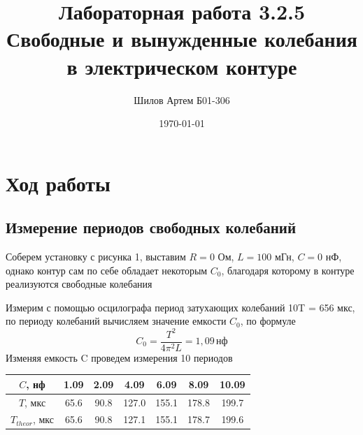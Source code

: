 \documentclass[a4paper,12pt]{article}
\author{Шилов Артем Б01-306}
\title{Лабораторная работа 3.2.5 \\
	\textbf{Свободные и вынужденные колебания в электрическом контуре}}
\date{\today}
\theoremstyle{definition}
\begin{document}
	
{\Large \maketitle}


\section{Ход работы}
\subsection{Измерение периодов свободных колебаний}
Соберем установку с рисунка 1, выставим $R=0$ Ом, $L=100$ мГн, $C=0$ нФ,  однако контур сам по себе обладает некоторым $C_0$, благодаря которому в контуре реализуются свободные колебания \par
Измерим с помощью осцилографа период затухающих колебаний 10T = 656 мкс, по периоду колебаний вычисляем значение емкости $C_0$, по формуле
$$C_0=\frac{T^2}{4\pi^2L}=1,09\,\text{нф}$$
Изменяя емкость C проведем измерения 10 периодов \\
\begin{center}
\begin{tabular}{|c|c|c|c|c|c|c|} \hline
    $C$, нф & 1.09& 2.09 & 4.09 & 6.09& 8.09&  10.09 \\ \hline
    $T$, мкс & 65.6& 90.8&127.0 &155.1 &178.8 &199.7   \\ \hline
    $T_{theor}$, мкс & 65.6 & 90.8 & 127.1 & 155.1& 178.7 & 199.6  \\ \hline
\end{tabular}
\end{center}
\end{document}
